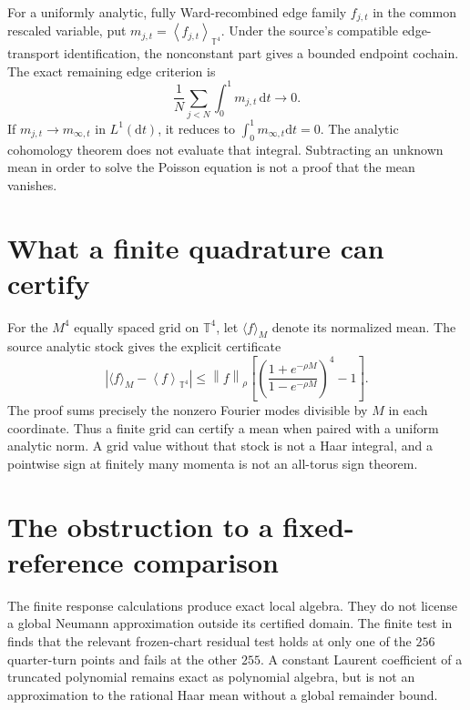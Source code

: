 \documentclass[11pt,oneside,openany]{book}
\theoremstyle{definition}
\theoremstyle{remark}
\newcommand{\T}{\mathbb T}
\newcommand{\dd}{\mathrm d}
\newcommand{\norm}[1]{\left\lVert#1\right\rVert}
\newcommand{\abs}[1]{\left\lvert#1\right\rvert}
\newcommand{\avg}[1]{\left\langle#1\right\rangle_{\T^4}}
\newcommand{\src}[2]{\cite[#2]{#1}}
\begin{document}
For a uniformly analytic, fully Ward-recombined edge family $f_{j,t}$ in the common rescaled variable, put $m_{j,t}=\avg{f_{j,t}}$. Under the source's compatible edge-transport identification, the nonconstant part gives a bounded endpoint cochain. The exact remaining edge criterion is
\begin{equation}\label{eq:edge-scalar}
\frac1N\sum_{j<N}\int_0^1m_{j,t}\,\dd t\longrightarrow0.
\end{equation}
If $m_{j,t}\to m_{\infty,t}$ in $L^1(\dd t)$, it reduces to $\int_0^1m_{\infty,t}\dd t=0$. The analytic cohomology theorem does not evaluate that integral. Subtracting an unknown mean in order to solve the Poisson equation is not a proof that the mean vanishes.

\section{What a finite quadrature can certify}
For the $M^4$ equally spaced grid on $\T^4$, let $\langle f\rangle_M$ denote its normalized mean. The source analytic stock gives the explicit certificate
\begin{equation}\label{eq:quadrature}
\abs{\langle f\rangle_M-\avg f}
\le\norm f_\rho
\left[\left(\frac{1+e^{-\rho M}}{1-e^{-\rho M}}\right)^4-1\right].
\end{equation}
The proof sums precisely the nonzero Fourier modes divisible by $M$ in each coordinate. Thus a finite grid can certify a mean when paired with a uniform analytic norm. A grid value without that stock is not a Haar integral, and a pointwise sign at finitely many momenta is not an all-torus sign theorem.

\section{The obstruction to a fixed-reference comparison}
The finite response calculations produce exact local algebra. They do not license a global Neumann approximation outside its certified domain. The finite test in \src{F11}{V31} finds that the relevant frozen-chart residual test holds at only one of the $256$ quarter-turn points and fails at the other $255$. A constant Laurent coefficient of a truncated polynomial remains exact as polynomial algebra, but is not an approximation to the rational Haar mean without a global remainder bound.
\end{document}
